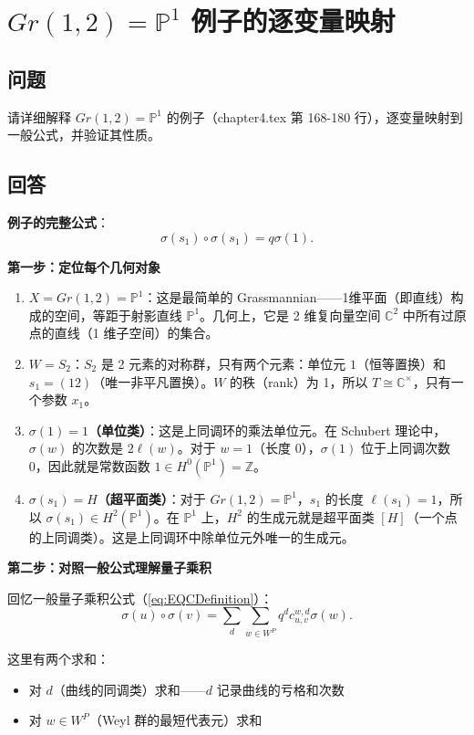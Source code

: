 \section{$Gr(1,2) = \mathbb{P}^1$ 例子的逐变量映射}\label{sec:Gr12-P1-example}
\subsection{问题}
请详细解释 $Gr(1,2) = \mathbb{P}^1$ 的例子（chapter4.tex 第 168-180 行），逐变量映射到一般公式，并验证其性质。

\subsection{回答}
\textbf{例子的完整公式}：
$$\sigma(s_1) \circ \sigma(s_1) = q \sigma(1).$$

\textbf{第一步：定位每个几何对象}

\begin{enumerate}
\item \textbf{$X = Gr(1,2) = \mathbb{P}^1$}：这是最简单的 Grassmannian——1维平面（即直线）构成的空间，等距于射影直线 $\mathbb{P}^1$。几何上，它是 2 维复向量空间 $\mathbb{C}^2$ 中所有过原点的直线（1 维子空间）的集合。

\item \textbf{$W = S_2$}：$S_2$ 是 2 元素的对称群，只有两个元素：单位元 $1$（恒等置换）和 $s_1 = (12)$（唯一非平凡置换）。$W$ 的秩（rank）为 1，所以 $T \cong \mathbb{C}^\times$，只有一个参数 $x_1$。

\item \textbf{$\sigma(1) = 1$（单位类）}：这是上同调环的乘法单位元。在 Schubert 理论中，$\sigma(w)$ 的次数是 $2\ell(w)$。对于 $w = 1$（长度 0），$\sigma(1)$ 位于上同调次数 0，因此就是常数函数 $1 \in H^0(\mathbb{P}^1) = \mathbb{Z}$。

\item \textbf{$\sigma(s_1) = H$（超平面类）}：对于 $Gr(1,2) = \mathbb{P}^1$，$s_1$ 的长度 $\ell(s_1) = 1$，所以 $\sigma(s_1) \in H^2(\mathbb{P}^1)$。在 $\mathbb{P}^1$ 上，$H^2$ 的生成元就是超平面类 $[H]$（一个点的上同调类）。这是上同调环中除单位元外唯一的生成元。
\end{enumerate}

\textbf{第二步：对照一般公式理解量子乘积}

回忆一般量子乘积公式（\cref{eq:EQCDefinition}）：
$$\sigma(u) \circ \sigma(v) = \sum_{d} \sum_{w \in W^P} q^d c_{u,v}^{w,d} \sigma(w).$$

这里有两个求和：
\begin{itemize}
\item 对 $d$（曲线的同调类）求和——$d$ 记录曲线的亏格和次数
\item 对 $w \in W^P$（Weyl 群的最短代表元）求和
\end{itemize}

